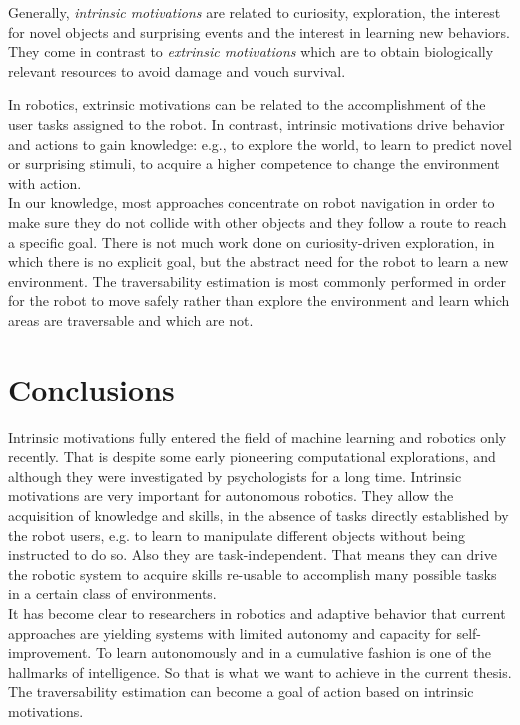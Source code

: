 \documentclass[12pt,a4paper,table,dvipsnames,tikz]{report}
\newcommand{\term}{\textit}
\begin{document}
	Generally, \term{intrinsic motivations} are related to curiosity, exploration, 
	the interest for novel objects and surprising events and the interest in 
	learning new behaviors. They come in contrast to \term{extrinsic motivations} 
	which are to obtain biologically relevant resources to avoid damage and vouch 
	survival.
	\par
	In robotics, extrinsic motivations can be related to the accomplishment of the 
	user tasks assigned to the robot. In contrast, intrinsic motivations drive 
	behavior and actions to gain knowledge: e.g., to explore the world, to learn to 
	predict novel or surprising stimuli, to acquire a higher competence to change 
	the environment with action.
	\\
	
	In our knowledge, most approaches concentrate on robot navigation in order to 
	make sure they do not collide with other objects and they follow a route to 
	reach a specific goal. There is not much work done on curiosity-driven 
	exploration, in which there is no explicit goal, but the abstract need for the 
	robot to learn a new environment. The traversability estimation is most commonly 
	performed in order for the robot to move safely rather than explore the 
	environment and learn which areas are traversable and which are not.
	\\
		
	\section{Conclusions}
	\label{sec:bg:concl}
	
	Intrinsic motivations fully entered the field of machine learning and robotics 
	only recently. That is despite some early pioneering computational explorations, 
	and although they were investigated by psychologists for a long time. Intrinsic 
	motivations are very important for autonomous robotics. They allow the acquisition 
	of knowledge and skills, in the absence of tasks directly established by the robot 
	users, e.g. to learn to manipulate different objects without being instructed to 
	do so. Also they are task-independent. That means they can drive the robotic system 
	to acquire skills re-usable to accomplish many possible tasks in a certain class 
	of environments.
	\\
	
	It has become clear to researchers in robotics and adaptive behavior that 
	current approaches are yielding systems with limited autonomy and capacity for 
	self-improvement. To learn autonomously and in a cumulative fashion is one of 
	the hallmarks of intelligence. So that is what we want to achieve in the current 
	thesis. The traversability estimation can become a goal of action based on 
	intrinsic motivations.
	\\
	
\end{document}
